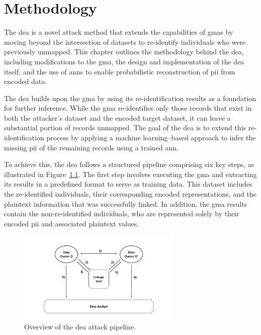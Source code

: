 \chapter{Methodology}  \label{sec:method}

The \ac{dea} is a novel attack method that extends the capabilities of \ac{gma}s by moving beyond the intersection of datasets to re-identify individuals who were previously unmapped.
This chapter outlines the methodology behind the \ac{dea}, including modifications to the \ac{gma}, the design and implementation of the \ac{dea} itself, and the use of \ac{ann}s to enable probabilistic reconstruction of \ac{pii} from encoded data.

The \ac{dea} builds upon the \ac{gma} by using its re-identification results as a foundation for further inference.
While the \ac{gma} re-identifies only those records that exist in both the attacker’s dataset and the encoded target dataset, it can leave a substantial portion of records unmapped.
The goal of the \ac{dea} is to extend this re-identification process by applying a machine learning–based approach to infer the missing \ac{pii} of the remaining records using a trained \ac{ann}.

To achieve this, the \ac{dea} follows a structured pipeline comprising six key steps, as illustrated in Figure~\ref{fig:deaoverview}.
The first step involves executing the \ac{gma} and extracting its results in a predefined format to serve as training data.
This dataset includes the re-identified individuals, their corresponding encoded representations, and the plaintext information that was successfully linked.
In addition, the \ac{gma} results contain the non-re-identified individuals, who are represented solely by their encoded \ac{pii} and associated plaintext values.

\begin{figure}[H]
    \centering
    \includegraphics[width=0.7\textwidth, page=15]{img/visualization.pdf}
    \caption{Overview of the \ac{dea} attack pipeline.}
    \label{fig:deaoverview}
\end{figure}

